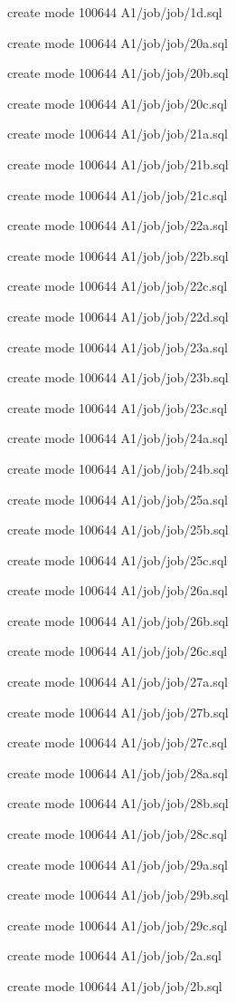 \documentclass[11pt,a4paper]{article}
\begin{document}
{create mode 100644 A1/job/job/1d.sql

create mode 100644 A1/job/job/20a.sql

create mode 100644 A1/job/job/20b.sql

create mode 100644 A1/job/job/20c.sql

create mode 100644 A1/job/job/21a.sql

create mode 100644 A1/job/job/21b.sql

create mode 100644 A1/job/job/21c.sql

create mode 100644 A1/job/job/22a.sql

create mode 100644 A1/job/job/22b.sql

create mode 100644 A1/job/job/22c.sql

create mode 100644 A1/job/job/22d.sql

create mode 100644 A1/job/job/23a.sql

create mode 100644 A1/job/job/23b.sql

create mode 100644 A1/job/job/23c.sql

create mode 100644 A1/job/job/24a.sql

create mode 100644 A1/job/job/24b.sql

create mode 100644 A1/job/job/25a.sql

create mode 100644 A1/job/job/25b.sql

create mode 100644 A1/job/job/25c.sql

create mode 100644 A1/job/job/26a.sql

create mode 100644 A1/job/job/26b.sql

create mode 100644 A1/job/job/26c.sql

create mode 100644 A1/job/job/27a.sql

create mode 100644 A1/job/job/27b.sql

create mode 100644 A1/job/job/27c.sql

create mode 100644 A1/job/job/28a.sql

create mode 100644 A1/job/job/28b.sql

create mode 100644 A1/job/job/28c.sql

create mode 100644 A1/job/job/29a.sql

create mode 100644 A1/job/job/29b.sql

create mode 100644 A1/job/job/29c.sql

create mode 100644 A1/job/job/2a.sql

create mode 100644 A1/job/job/2b.sql

}
\end{document}
